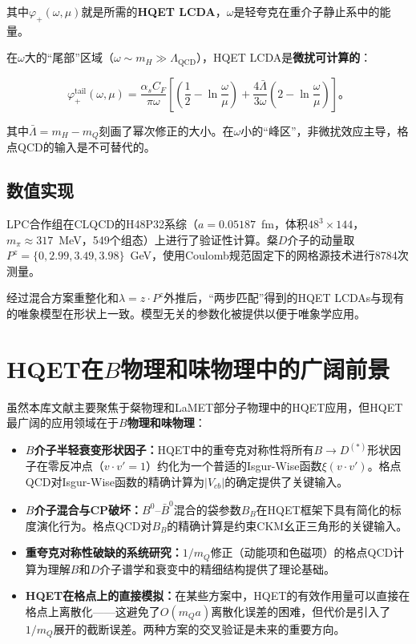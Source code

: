 \documentclass[12pt,a4paper]{ctexart}
\theoremstyle{definition}
\begin{document}
其中$\varphi_+(\omega, \mu)$就是所需的\textbf{HQET LCDA}，$\omega$是轻夸克在重介子静止系中的能量。

在$\omega$大的``尾部''区域（$\omega \sim m_H \gg \Lambda_{\text{QCD}}$），HQET LCDA是\textbf{微扰可计算的}\cite{Han2025heavy}：

\begin{equation}
\varphi_+^{\text{tail}}(\omega, \mu) = \frac{\alpha_s C_F}{\pi\omega} \left[ \left(\frac{1}{2} - \ln\frac{\omega}{\mu}\right) + \frac{4\bar{\Lambda}}{3\omega}\left(2 - \ln\frac{\omega}{\mu}\right) \right]。
\label{eq:tail_region}
\end{equation}

其中$\bar{\Lambda} = m_H - m_Q$刻画了幂次修正的大小。在$\omega$小的``峰区''，非微扰效应主导，格点QCD的输入是不可替代的。

\subsection{数值实现}

LPC合作组在CLQCD的H48P32系综（$a = 0.05187$~fm，体积$48^3 \times 144$，$m_\pi \approx 317$~MeV，549个组态）上进行了验证性计算。粲$D$介子的动量取$P^z = \{0, 2.99, 3.49, 3.98\}$~GeV，使用Coulomb规范固定下的网格源技术进行8784次测量。

经过混合方案重整化和$\lambda = z\cdot P^z$外推后，``两步匹配''得到的HQET LCDAs与现有的唯象模型在形状上一致。模型无关的参数化被提供以便于唯象学应用。

\section{HQET在$B$物理和味物理中的广阔前景}

虽然本库文献主要聚焦于粲物理和LaMET部分子物理中的HQET应用，但HQET最广阔的应用领域在于\textbf{$B$物理和味物理}：

\begin{itemize}
    \item \textbf{$B$介子半轻衰变形状因子：}HQET中的重夸克对称性将所有$B \to D^{(*)}$形状因子在零反冲点（$v \cdot v' = 1$）约化为一个普适的Isgur-Wise函数$\xi(v\cdot v')$。格点QCD对Isgur-Wise函数的精确计算为$|V_{cb}|$的确定提供了关键输入。

    \item \textbf{$B$介子混合与CP破坏：}$B^0$--$\bar{B}^0$混合的袋参数$B_{B}$在HQET框架下具有简化的标度演化行为。格点QCD对$B_{B}$的精确计算是约束CKM幺正三角形的关键输入。

    \item \textbf{重夸克对称性破缺的系统研究：}$1/m_Q$修正（动能项和色磁项）的格点QCD计算为理解$B$和$D$介子谱学和衰变中的精细结构提供了理论基础。

    \item \textbf{HQET在格点上的直接模拟：}在某些方案中，HQET的有效作用量可以直接在格点上离散化——这避免了$O(m_Q a)$离散化误差的困难，但代价是引入了$1/m_Q$展开的截断误差。两种方案的交叉验证是未来的重要方向。
\end{itemize}
\end{document}
